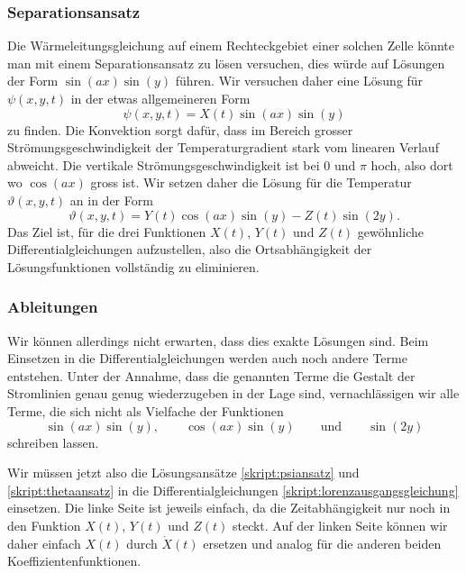 \subsubsection{Separationsansatz}
Die Wärmeleitungsgleichung auf einem Rechteckgebiet 
einer solchen Zelle könnte man mit einem Separationsansatz zu lösen
versuchen, dies würde auf Lösungen der Form
$\sin(ax)\sin(y)$
führen.
Wir versuchen daher eine Lösung für $\psi(x,y,t)$ in der etwas
allgemeineren Form
\begin{equation}
\psi(x,y,t)
=
X(t) \sin(ax)\sin(y)
\label{skript:psiansatz}
\end{equation}
zu finden.
Die Konvektion sorgt dafür, dass im Bereich grosser
Strömungsgeschwindigkeit der Temperaturgradient stark vom linearen Verlauf
abweicht.
Die vertikale Strömungsgeschwindigkeit ist bei $0$ und $\pi$ hoch, also
dort wo $\cos(ax)$ gross ist.
Wir setzen daher die Lösung für die Temperatur $\vartheta(x,y,t)$ an in der
Form
\begin{equation}
\vartheta(x,y,t)
=
Y(t) \cos(ax) \sin(y) - Z(t) \sin(2y).
\label{skript:thetaansatz}
\end{equation}
Das Ziel ist, für die drei Funktionen $X(t)$, $Y(t)$ und $Z(t)$
gewöhnliche Differentialgleichungen aufzustellen, also die Ortsabhängigkeit
der Lösungsfunktionen vollständig zu eliminieren.

\subsubsection{Ableitungen}
Wir können allerdings nicht erwarten, dass dies exakte Lösungen sind.
Beim Einsetzen in die Differentialgleichungen werden auch noch
andere Terme entstehen.
Unter der Annahme, dass die genannten Terme die Gestalt der Stromlinien
genau genug wiederzugeben in der Lage sind, vernachlässigen wir alle
Terme, die sich nicht als Vielfache der Funktionen
\begin{equation}
\sin(ax)\sin(y),
\qquad
\cos(ax)\sin(y)
\qquad\text{und}\qquad
\sin(2y)
\label{skript:funktionsauswahl}
\end{equation}
schreiben lassen.

Wir müssen jetzt also die Lösungsansätze
\eqref{skript:psiansatz}
und
\eqref{skript:thetaansatz}
in die Differentialgleichungen
\eqref{skript:lorenzausgangsgleichung}
einsetzen.
Die linke Seite ist jeweils einfach, da die Zeitabhängigkeit nur noch
in den Funktion $X(t)$, $Y(t)$ und $Z(t)$ steckt.
Auf der linken Seite können wir daher einfach $X(t)$ durch $\dot X(t)$
ersetzen und analog für die anderen beiden Koeffizientenfunktionen.

